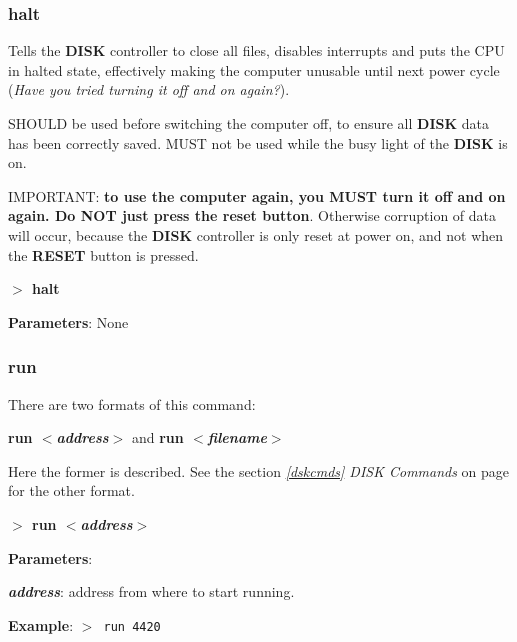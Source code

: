 \documentclass[a4paper,11pt]{article}
\begin{document}
        \subsubsection{{\color{blue}halt}}
        Tells the \textbf{DISK} controller to close all files, disables
        interrupts and puts the CPU in halted state, effectively making the
        computer unusable until next power cycle (\textit{Have you tried turning
        it off and on again?}).

        SHOULD be used before switching the computer off, to ensure all
        \textbf{DISK} data has been correctly saved. MUST not be used while the
        busy light of the \textbf{DISK} is on.

        IMPORTANT: \textbf{to use the computer again, you MUST turn it off and
        on again. Do NOT just press the reset button}. Otherwise corruption of
        data will occur, because the \textbf{DISK} controller is only reset at
        power on, and not when the \textbf{RESET} button is pressed.

        \hspace{1.9cm}\textbf{$>$ halt}

        \textbf{Parameters}: None

        \subsubsection{{\color{blue}run}}
        There are two formats of this command:

        \textbf{run \textit{$<$address$>$}} and \textbf{run 
        \textit{$<$filename$>$}}
        
        Here the former is described. See the section \textit{\ref{dskcmds}
        DISK Commands} on page \pageref{dskcmds} for the other format.

        \hspace{1.9cm}\textbf{$>$ run \textit{$<$address$>$}}

        \textbf{Parameters}:

        \hspace{1cm}\textbf{\textit{address}}: address from where to start
        running.
        
        \textbf{Example}: \texttt{$>$ run 4420}
\end{document}
